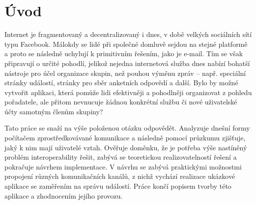 \documentclass[12pt,oneside,final]{fithesis2}
\begin{document}
\FrontMatter
\ThesisTitlePage



\begin{ThesisDeclaration}
\DeclarationText
\AdvisorName
\end{ThesisDeclaration}












\tableofcontents



\MainMatter






\chapter{Úvod}\label{introduction}
Internet je fragmentovaný a decentralizovaný i dnes, v době velkých sociálních sítí typu Facebook. Málokdy se lidé při společné domluvě sejdou na stejné platformě a proto se následně uchylují k primitivním řešením, jako je e-mail. Tím se však připravují o určité pohodlí, jelikož nejedna internetová služba dnes nabízí bohatší nástroje pro účel organizace skupin, než pouhou výměnu zpráv -- např. speciální stránky událostí, stránky pro sběr anketních odpovědí a další. Bylo by možné vytvořit aplikaci, která pomůže lidi efektivněji a pohodlněji organizovat z pohledu pořadatele, ale přitom nevnucuje žádnou konkrétní službu či nové uživatelské účty samotným členům skupiny?

Tato práce se snaží na výše položenou otázku odpovědět. Analyzuje dnešní formy počítačem zprostředkovávané komunikace a následně pomocí průzkumu zjišťuje, jaký k nim mají uživatelé vztah. Ověřuje doměnku, že je potřeba výše nastíněný problém interoperability řešit, zabývá se teoretickou realizovatelností řešení a pokračuje návrhem implementace. V návrhu se zabývá praktickými možnostmi propojení různých komunikačních kanálů, z nichž vychází realizace ukázkové aplikace se zaměřením na správu událostí. Práce končí popisem tvorby této aplikace a zhodnocením jejího provozu.
\end{document}
